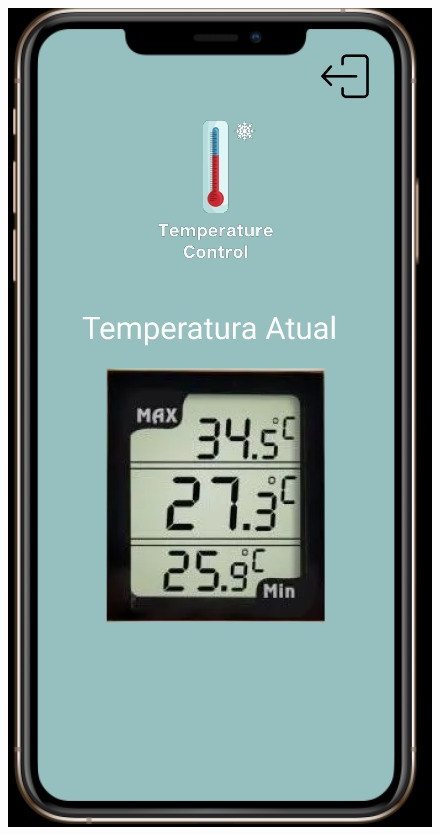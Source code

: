 \begin{figure}
\begin{minipage}{0.5\textwidth}
            \centering
            \includegraphics[height=0.4\textheight]{img/mobile/temp_atual.jpeg}
            \label{fig:mobileTempAtual}
        \end{minipage}
    \end{figure}

